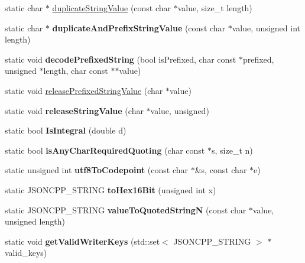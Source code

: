\begin{DoxyCompactItemize}
\item 
static char $\ast$ \hyperlink{namespaceJson_a678ac3a60cd70ec0fb4c9abfd40eb0c4}{duplicate\+String\+Value} (const char $\ast$value, size\+\_\+t length)
\item 
\mbox{\label{namespaceJson_a9795a09a0141d1f12d307c4386aeaee6}} 
static char $\ast$ {\bfseries duplicate\+And\+Prefix\+String\+Value} (const char $\ast$value, unsigned int length)
\item 
\mbox{\label{namespaceJson_aad8b4982c1acd164f541fba396ac9fb1}} 
static void {\bfseries decode\+Prefixed\+String} (bool is\+Prefixed, char const $\ast$prefixed, unsigned $\ast$length, char const $\ast$$\ast$value)
\item 
static void \hyperlink{namespaceJson_a48f4e3ea655e3b4a5d7f892c81f00511}{release\+Prefixed\+String\+Value} (char $\ast$value)
\item 
\mbox{\label{namespaceJson_a3e0d81d514d0e8bddf33b08074214abd}} 
static void {\bfseries release\+String\+Value} (char $\ast$value, unsigned)
\item 
\mbox{\label{namespaceJson_a1a04cc9d31e64b5912dade003c9b99b5}} 
static bool {\bfseries Is\+Integral} (double d)
\item 
\mbox{\label{namespaceJson_ae281325b4cbb7c2127c1ac90172261b5}} 
static bool {\bfseries is\+Any\+Char\+Required\+Quoting} (char const $\ast$s, size\+\_\+t n)
\item 
\mbox{\label{namespaceJson_a09f2caaead38dd396b21affdf87230ae}} 
static unsigned int {\bfseries utf8\+To\+Codepoint} (const char $\ast$\&s, const char $\ast$e)
\item 
\mbox{\label{namespaceJson_a32516165138491f1689956be8e4e7212}} 
static J\+S\+O\+N\+C\+P\+P\+\_\+\+S\+T\+R\+I\+NG {\bfseries to\+Hex16\+Bit} (unsigned int x)
\item 
\mbox{\label{namespaceJson_a29aff81733b8fdaabf3f1acfc3ad339f}} 
static J\+S\+O\+N\+C\+P\+P\+\_\+\+S\+T\+R\+I\+NG {\bfseries value\+To\+Quoted\+StringN} (const char $\ast$value, unsigned length)
\item 
\mbox{\label{namespaceJson_a77ffcc6bb405332d84c260d304d4384e}} 
static void {\bfseries get\+Valid\+Writer\+Keys} (std\+::set$<$ J\+S\+O\+N\+C\+P\+P\+\_\+\+S\+T\+R\+I\+NG $>$ $\ast$valid\+\_\+keys)
\end{DoxyCompactItemize}
